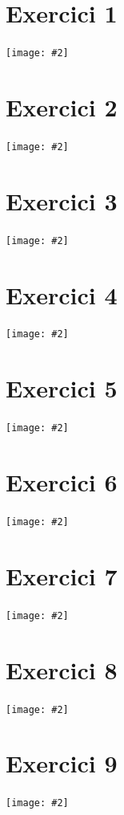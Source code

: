 \documentclass[a4paper,12pt]{article}
\makeatletter
\def\maxwidth#1{\ifdim\Gin@nat@width>#1 #1\else\Gin@nat@width\fi}
\newcommand{\mygraphic}[2][width=\maxwidth{\textwidth}]{\begin{center}
		\centering\texttt{[image: \#2]}\par
\end{center}}
\makeatother
\begin{document}



\newpage
\section{Exercici 1}
\mygraphic{out/1.eps}

\section{Exercici 2}
\mygraphic{out/2.eps}

\section{Exercici 3}
\mygraphic{out/3.eps}

\section{Exercici 4}
\mygraphic{out/4.eps}

\section{Exercici 5}
\mygraphic{out/5.eps}

\section{Exercici 6}
\mygraphic{out/6.eps}

\section{Exercici 7}
\mygraphic{out/7.eps}

\section{Exercici 8}
\mygraphic{out/8.eps}

\section{Exercici 9}
\mygraphic{out/9.eps}
\end{document}
